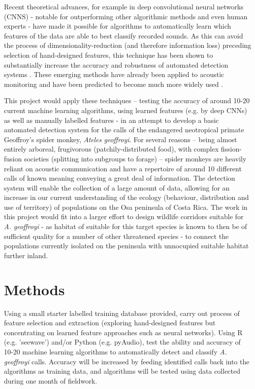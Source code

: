 \documentclass[11pt]{article}
\begin{document}
Recent theoretical advances, for example in deep convolutional neural networks (CNNS) \citep{lecun2015deep,goeau:hal-01373779} - notable for outperforming other algorithmic methods and even human experts \citep[e.g.][]{kiskin2017mosquito} - have made it possible for algorithms to automatically learn which features of the data are able to best classify recorded sounds. As this can avoid the process of dimensionality-reduction (and therefore information loss) preceding selection of hand-designed features, this technique has been shown to substantially increase the accuracy and robustness of automated detection systems \citep{stowell2014automatic,browning2017passive}. These emerging methods have already been applied to acoustic monitoring \citep[e.g.][]{goeau:hal-01373779,macaodha2018bat} and have been predicted to become much more widely used \citep{browning2017passive}.

This project would apply these techniques – testing the accuracy of around 10-20 current machine learning algorithms, using learned features (e.g. by deep CNNs) as well as manually labelled features - in an attempt to develop a basic automated detection system for the calls of the endangered neotropical primate Geoffroy’s spider monkey, \textit{Ateles geoffroyi}. For several reasons – being almost entirely arboreal, frugivorous (patchily-distributed food), with complex fission-fusion societies (splitting into subgroups to forage) – spider monkeys are heavily reliant on acoustic communication and have a repertoire of around 10 different calls of known meaning \citep{ramos2008communication} conveying a great deal of information. The detection system will enable the collection of a large amount of data, allowing for an increase in our current understanding of the ecology (behaviour, distribution and use of territory) of populations on the Osa peninsula of Costa Rica. The work in this project would fit into a larger effort to design wildlife corridors suitable for \textit{A. geoffroyi} - as habitat of suitable for this target species is known to then be of sufficient quality for a number of other threatened species - to connect the populations currently isolated on the peninsula with unnocupied suitable habitat further inland. 


\section{Methods}

Using a small starter labelled training database provided, carry out process of feature selection and extraction (exploring hand-designed features but concentrating on learned feature approaches such as neural networks). Using R (e.g. 'seewave') and/or Python (e.g. pyAudio), test the ability and accuracy of 10-20 machine learning algorithms to automatically detect and classify \textit{A. geoffroyi} calls. Accuracy will be increased by feeding identified calls back into the algorithms as training data, and algorithms will be tested using data collected during one month of fieldwork. 
\end{document}
